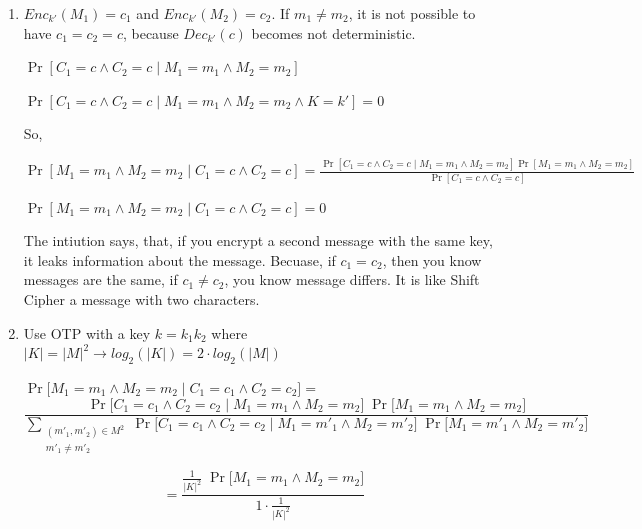 \begin{enumerate}
	\item[(a)] $Enc_{k'}(M_1) = c_1$ and $Enc_{k'}(M_2) = c_2$. If $m_1 \ne m_2$, it is not possible to have $c_1 = c_2 = c$, because $Dec_{k'}(c)$ becomes not deterministic.
	
	$\Pr[C_1 = c \land C_2 = c \mid M_1 = m_1 \land M_2 = m_2]$
	
	$\Pr[C_1 = c \land C_2 = c \mid M_1 = m_1 \land M_2 = m_2 \land K = k'] = 0$
	
	So,
	
	$\Pr[M_1 = m_1 \land M_2 = m_2 \mid C_1 = c \land C_2 = c] = \frac{\Pr[C_1 = c \land C_2 = c \mid M_1 = m_1 \land M_2 = m_2]\Pr[ M_1 = m_1 \land M_2 = m_2]}{\Pr[C_1 = c \land C_2 = c]}$
	
	$\Pr[M_1 = m_1 \land M_2 = m_2 \mid C_1 = c \land C_2 = c] = 0$
	
	The intiution says, that, if you encrypt a second message with the same key, it leaks information about the message. Becuase, if $c_1 = c_2$, then you know messages are the same, if $c_1 \ne c_2$, you know message differs. It is like Shift Cipher a message with two characters.
	
	\item[(b)] Use OTP with a key $k = k_1k_2$ where $|K| = |M|^2 \rightarrow log_2(|K|) = 2 \cdot log_2(|M|)$
	
	$\Pr\!\bigl[M_1 = m_1 \land M_2 = m_2 \;\big|\; C_1 = c_1 \land C_2 = c_2\bigr] = $ 
	\[
	\frac{\Pr\!\bigl[C_1 = c_1 \land C_2 = c_2 \;\big|\; M_1 = m_1 \land M_2 = m_2\bigr]\;
		\Pr\!\bigl[M_1 = m_1 \land M_2 = m_2\bigr]}
	{\displaystyle
		\sum_{\substack{(m'_1,m'_2)\in M^2\\ m'_1 \neq m'_2}}
		\Pr\!\bigl[C_1 = c_1 \land C_2 = c_2 \;\big|\; M_1 = m'_1 \land M_2 = m'_2\bigr]\;
		\Pr\!\bigl[M_1 = m'_1 \land M_2 = m'_2\bigr]}
	\tag{Bayes}
	\]
	
	\[
	= \frac{\frac{1}{|K|^2}\;
		\Pr\!\bigl[M_1 = m_1 \land M_2 = m_2\bigr]}
	{\displaystyle
		1 \cdot \frac{1}{|K|^2}}
	\]
	
\end{enumerate}



